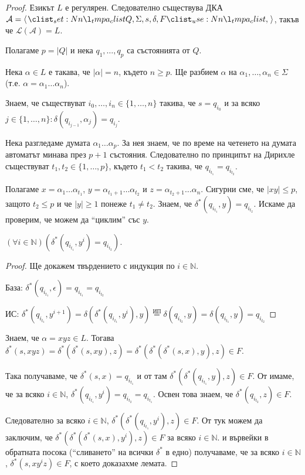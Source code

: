 \begin{proof}
    Езикът $L$ е регулярен.
    Следователно съществува ДКА
    $\mathcal{A} = \opair{Q, \Sigma, s, \delta, F}$,
    такъв че $\mathcal{L}(\mathcal{A}) = L$.

    Полагаме $p = |Q|$ и нека $q_1, \dots, q_p$ са състоянията от $Q$.

    Нека $\alpha \in L$ е такава, че $|\alpha| = n$, където $n \geq p$.
    Ще разбием $\alpha$ на $\alpha_1, \dots, \alpha_n \in \Sigma$ (т.е. $\alpha = \alpha_1\dots\alpha_n$).

    Знаем, че съществуват $i_0, \dots, i_n \in \{1, \dots, n \}$ такива,
    че $s = q_{i_0}$ и за всяко $j \in \{1, \dots, n\} : \delta(q_{i_{j-1}}, \alpha_j) = q_{i_j}$.

    Нека разгледаме думата $\alpha_1 \dots \alpha_p$.
    За нея знаем, че по време на четенето на думата автоматът минава през $p + 1$ състояния.
    Следователно по принципът на Дирихле съществуват
    $t_1, t_2 \in \{1, \dots, p\}$, където $t_1 < t_2$ такива, че $q_{i_{t_1}} = q_{i_{t_2}}$.

    Полагаме $x = \alpha_1 \dots \alpha_{t_1}$, $y = \alpha_{t_1 + 1} \dots \alpha_{t_2}$ и $z = \alpha_{t_2 + 1} \dots \alpha_n$.
    Сигурни сме, че $|xy| \leq p$, защото $t_2 \leq p$ и че $|y| \geq 1$ понеже $t_1 \neq t_2$.
    Знаем, че $\delta^*(q_{i_{t_1}}, y) = q_{i_{t_2}}$.
    Искаме да проверим, че можем да ``циклим'' със $y$.

    \begin{claim}
        $(\forall i \in \mathbb{N}) (\delta^*(q_{i_{t_1}}, y^i) = q_{i_{t_2}})$.
    \end{claim}

    \begin{proof}
        Ще докажем твърдението с индукция по $i \in \mathbb{N}$.

        База: $\delta^*(q_{i_{t_1}}, \epsilon) = q_{i_{t_1}} = q_{i_{t_2}}$ \checkmark

        ИС: $\delta^*(q_{i_{t_1}}, y^{i+1}) = \delta(\delta^*(q_{i_{t_1}}, y^i), y) \overset{\text{ИП}}{=} \delta(q_{i_{t_2}}, y) = \delta(q_{i_{t_1}}, y) = q_{i_{t_2}}$
    \end{proof}

    Знаем, че $\alpha = xyz \in L$.
    Тогава $\delta^*(s, xyz) = \delta^*(\delta^*(s, xy), z) = \delta^*(\delta^*(\delta^*(s, x), y), z) \in F$.

    Така получаваме, че $\delta^*(s, x) = q_{i_{t_1}}$ и от там $\delta^*(\delta^*(q_{i_{t_1}}, y), z) \in F$.
    От  имаме, че за всяко $ i \in \mathbb{N}$,  $\delta^*(q_{i_{t_1}}, y^i) = q_{i_{t_2}} = q_{i_{t_1}}$.
    Освен това знаем, че $\delta^*(q_{i_{t_2}}, z) \in F$.

    Следователно за всяко $i \in \mathbb{N}$, $\delta^*(\delta^*(q_{i_{t_1}}, y^i), z) \in F$.
    От тук можем да заключим, че $\delta^*(\delta^*(\delta^*(s, x), y^i), z) \in F$ за всяко $ i \in \mathbb{N}$.
    и вървейки в обратната посока (``сливането'' на всички $\delta^*$ в едно) получаваме,
    че за всяко $ i \in \mathbb{N}$, $\delta^*(s, xy^iz) \in F$, с което доказахме лемата.
\end{proof}

